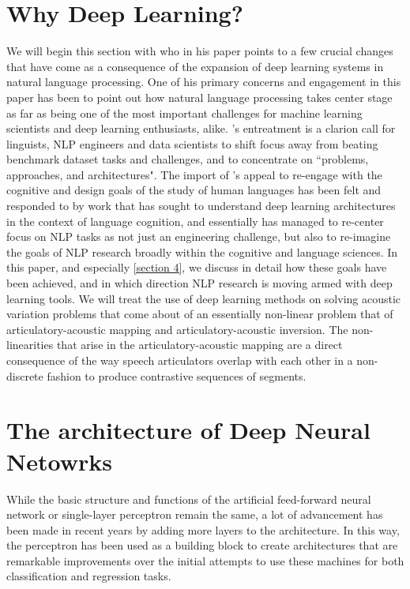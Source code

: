 \documentclass{article}[12pt]
\newcommand{\possessivecite}[1]{\citeauthor{#1}'s \citeyear{#1}}
\begin{document}
\section{Why Deep Learning?}
We will begin this section with \cite{manning2015} who in his paper points to a few crucial changes that have come as a consequence of the expansion of deep learning systems in natural language processing. One of his primary concerns and engagement in this paper has been to point out how natural language processing takes center stage as far as being one of the most important challenges for machine learning scientists and deep learning enthusiasts, alike. \possessivecite{manning2015} entreatment is a clarion call for linguists, NLP engineers and data scientists to shift focus away from beating benchmark dataset tasks and challenges, and to concentrate on ``problems, approaches, and architectures". The import of \possessivecite{manning2015} appeal to re-engage with the cognitive and design goals of the study of human languages has been felt and responded to by work that has sought to understand deep learning architectures in the context of language cognition, and essentially has managed to re-center focus on NLP tasks as not just an engineering challenge, but also to re-imagine the goals of NLP research broadly within the cognitive and language sciences. In this paper, and especially \ref{section 4}, we discuss in detail how these goals have been achieved, and in which direction NLP research is moving armed with deep learning tools. We will treat the use of deep learning methods on solving acoustic variation problems that come about of an essentially non-linear problem that of articulatory-acoustic mapping and articulatory-acoustic inversion. The non-linearities that arise in the articulatory-acoustic mapping are a direct consequence of the way speech articulators overlap with each other in a non-discrete fashion to produce contrastive sequences of segments.

\section{The architecture of Deep Neural Netowrks}
While the basic structure and functions of the artificial feed-forward neural network or single-layer perceptron remain the same, a lot of advancement has been made in recent years by adding more layers to the architecture. In this way, the perceptron has been used as a building block to create architectures that are remarkable improvements over the initial attempts to use these machines for both classification and regression tasks.
\end{document}
